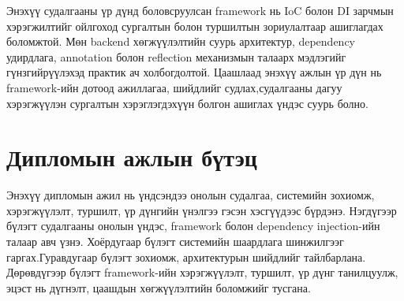 Энэхүү судалгааны үр дүнд боловсруулсан framework нь IoC болон DI зарчмын хэрэгжилтийг ойлгоход сургалтын болон туршилтын зориулалтаар ашиглагдах боломжтой. Мөн backend хөгжүүлэлтийн суурь архитектур, dependency удирдлага, annotation болон reflection механизмын талаарх мэдлэгийг гүнзгийрүүлэхэд практик ач холбогдолтой. Цаашлаад энэхүү ажлын үр дүн нь framework-ийн дотоод ажиллагаа, шийдлийг судлах,судалгааны дагуу хэрэгжүүлэн сургалтын хэрэглэгдэхүүн болгон ашиглах үндэс суурь болно.

\section*{Дипломын ажлын бүтэц}

Энэхүү дипломын ажил нь үндсэндээ онолын судалгаа, системийн зохиомж, хэрэгжүүлэлт, туршилт, үр дүнгийн үнэлгээ гэсэн хэсгүүдээс бүрдэнэ. Нэгдүгээр бүлэгт судалгааны онолын үндэс, framework болон dependency injection-ийн талаар авч үзнэ. Хоёрдугаар бүлэгт системийн шаардлага шинжилгээг гаргах.Гуравдугаар бүлэгт зохиомж, архитектурын шийдлийг тайлбарлана. Дөрөвдүгээр бүлэгт framework-ийн хэрэгжүүлэлт, туршилт, үр дүнг танилцуулж, эцэст нь дүгнэлт, цаашдын хөгжүүлэлтийн боломжийг тусгана.